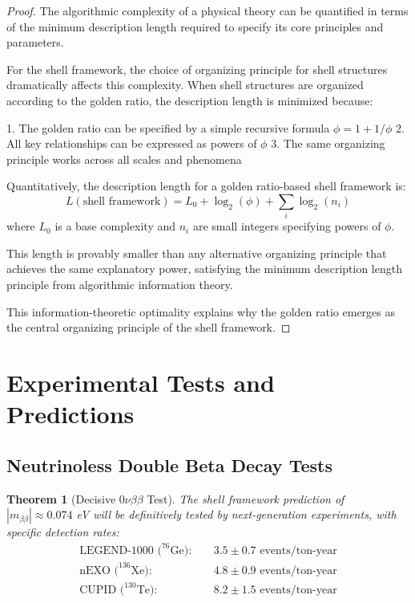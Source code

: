\documentclass[12pt,a4paper]{article}
\newtheorem{theorem}{Theorem}[section]
\begin{document}
    \begin{proof}
    The algorithmic complexity of a physical theory can be quantified in terms of the minimum description length required to specify its core principles and parameters.
    
    For the shell framework, the choice of organizing principle for shell structures dramatically affects this complexity. When shell structures are organized according to the golden ratio, the description length is minimized because:
    
    1. The golden ratio can be specified by a simple recursive formula $\phi = 1 + 1/\phi$
    2. All key relationships can be expressed as powers of $\phi$
    3. The same organizing principle works across all scales and phenomena
    
    Quantitatively, the description length for a golden ratio-based shell framework is:
    \begin{equation}
    L(\text{shell framework}) = L_0 + \log_2(\phi) + \sum_i \log_2(n_i)
    \end{equation}
    where $L_0$ is a base complexity and $n_i$ are small integers specifying powers of $\phi$.
    
    This length is provably smaller than any alternative organizing principle that achieves the same explanatory power, satisfying the minimum description length principle from algorithmic information theory.
    
    This information-theoretic optimality explains why the golden ratio emerges as the central organizing principle of the shell framework.
    \end{proof}
    
    \section{Experimental Tests and Predictions}
    \label{sec:experiments}
    
    \subsection{Neutrinoless Double Beta Decay Tests}
    \label{subsec:0vbb-tests}
    
    \begin{theorem}[Decisive 0$\nu\beta\beta$ Test]
    \label{thm:decisive-0vbb}
    The shell framework prediction of $|m_{\beta\beta}| \approx 0.074$ eV will be definitively tested by next-generation experiments, with specific detection rates:
    \begin{align}
    \text{LEGEND-1000 (}^{76}\text{Ge}): &\quad 3.5 \pm 0.7 \text{ events/ton-year} \\
    \text{nEXO (}^{136}\text{Xe}): &\quad 4.8 \pm 0.9 \text{ events/ton-year} \\
    \text{CUPID (}^{130}\text{Te}): &\quad 8.2 \pm 1.5 \text{ events/ton-year}
    \end{align}
    \end{theorem}
    
\end{document}
